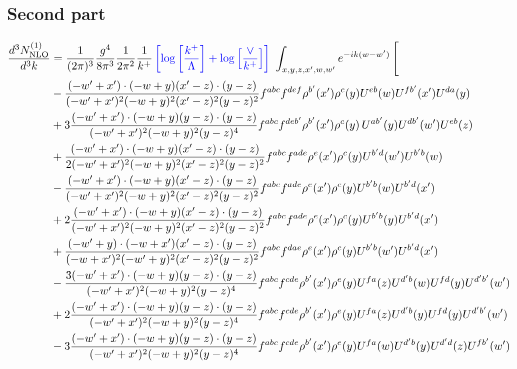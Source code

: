 \documentclass[aps,prd,amsmath,amssymb,nofootinbib]{revtex4-2}
\numberwithin{equation}{section}
\begin{document}
\subsubsection{Second part}
\begin{align}
     \frac{d^{3}N^{(1)}_{\rm NLO}}{d^{3}k} & = \frac{1}{(2\pi)^{3}}\frac{g^{4}}{8\pi^{3}}\frac{1}{2\pi^{2}} \frac{1}{k^{+}}\,{\color{blue}\left[\log{\left[\frac{k^{+}}{\Lambda}\right]}+\log{\left[\frac{\vee}{k^{+}}\right]}\right]}\,\,\int_{x,y,z,x^{\prime},w,w^{\prime}}e^{-ik(w-w^{\prime})}\, \Bigg[\notag \\ & - \frac{( - w' + x') \cdot ( - w + y) (x' - z) \cdot (y - z)}{( - w' + x')^{2} ( - w + y)^{2} (x' - z)^{2} (y - z)^{2}} f^{a b c} f^{d e f} \rho^{b'}(x') \rho^{c}(y) U^{e b}(w) U^{fb'}(x') U^{d a}(y) \nonumber\\
      &+ 3 \frac{( - w' + x') \cdot ( - w + y) (y - z) \cdot (y - z)}{( - w' + x')^{2} ( - w + y)^{2} (y - z)^{4}} f^{a b c} f^{d e b'} \rho^{b'}(x') \rho^{c}(y) \, U^{a b'}(y) U^{d b'}(w') U^{e b}(z)\nonumber\\
    &+\frac{( - w' + x') \cdot ( - w + y) (x' - z) \cdot (y - z)}{2 ( - w' + x')^{2} ( - w + y)^{2} (x' - z)^{2} (y - z)^{2}} f^{a b c} f^{a d e} \rho^{e}(x') \rho^{c}(y) U^{b'd}(w') U^{b' b}(w)\nonumber\\
    &- \frac{( - w' + x') \cdot ( - w + y) (x' - z) \cdot (y - z)}{( - w' + x')^{2} ( - w + y)^{2} (x' - z)^{2} (y - z)^{2}} f^{a b c} f^{a d e} \rho^{e}(x') \rho^{c}(y) U^{b' b}(w) U^{b' d}(x')\nonumber\\
    &+ 2 \frac{( - w' + x') \cdot ( - w + y) (x' - z) \cdot (y - z)}{( - w' + x')^{2} ( - w + y)^{2} (x' - z)^{2} (y - z)^{2}} f^{a b c} f^{a d e} \rho^{e}(x') \rho^{c}(y) U^{b' b}(y) U^{b' d}(x')\nonumber\\
    &+ \frac{( - w' + y) \cdot ( - w + x') (x' - z) \cdot (y - z)}{( - w + x')^{2} ( - w' + y)^{2} (x' - z)^{2} (y - z)^{2}} f^{a b c} f^{d a e} \rho^{e}(x') \rho^{c}(y) U^{b' b}(w') U^{b' d}(x')\nonumber\\
    &-\frac{3 ( - w' + x') \cdot ( - w + y) (y - z) \cdot (y - z)}{( - w' + x')^{2} ( - w + y)^{2} (y - z)^{4}} f^{a b c} f^{c d e} \rho^{b'}(x') \rho^{e}(y) U^{fa}(z) U^{d'b}(w) U^{fd}(y) U^{d'b'}(w')\nonumber\\
    &+ 2 \frac{( - w' + x') \cdot ( - w + y) (y - z) \cdot (y - z)}{( - w' + x')^{2} ( - w + y)^{2} (y - z)^{4}} f^{a b c} f^{c d e} \rho^{b'}(x') \rho^{e}(y) U^{fa}(z) U^{d'b}(y) U^{fd}(y) U^{d'b'}(w')\nonumber\\
    &- 3 \frac{( - w' + x') \cdot ( - w + y) (y - z) \cdot (y - z)}{( - w' + x')^{2} ( - w + y)^{2} (y - z)^{4}} f^{a b c} f^{c d e} \rho^{b'}(x') \rho^{e}(y) U^{fa}(w) U^{d'b}(y) U^{d'd}(z) U^{fb'}(w')\nonumber\\

\end{align}
\end{document}

